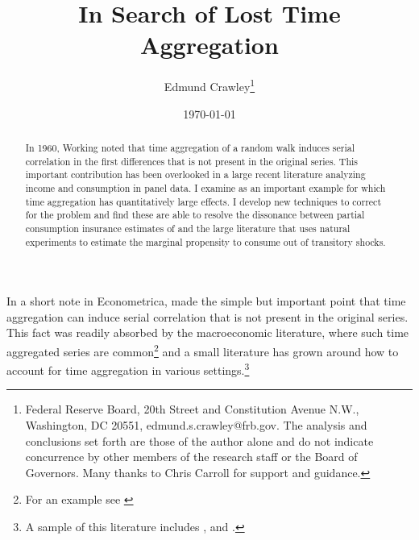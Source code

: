 \documentclass[AER]{AEA}
\begin{document}
\title{In Search of Lost Time Aggregation}
\author{Edmund Crawley\thanks{ Federal Reserve Board, 20th Street and Constitution Avenue N.W., Washington, DC 20551, edmund.s.crawley@frb.gov. The analysis and conclusions set forth are those of the author alone and do not indicate concurrence by other members of the research staff or the Board of Governors. Many thanks to Chris Carroll for support and guidance.}}
\date{\today}
\pubVolume{}
\pubIssue{}

\begin{abstract}
In 1960, Working noted that time aggregation of a random walk induces serial correlation in the first differences that is not present in the original series. This important contribution has been overlooked in a large recent literature analyzing income and consumption in panel data. I examine \cite{blundell_consumption_2008} as an important example for which time aggregation has quantitatively large effects. I develop new techniques to correct for the problem and find these are able to resolve the  dissonance between partial consumption insurance estimates of \cite{blundell_consumption_2008} and the large literature that uses natural experiments to estimate the marginal propensity to consume out of transitory shocks.
\end{abstract}


\maketitle

\newpage
In a short note in Econometrica, \cite{working_note_1960} made the simple but important point that time aggregation can induce serial correlation that is not present in the original series. This fact was readily absorbed by the macroeconomic literature, where such time aggregated series are common\footnote{For an example see \cite{campbell_consumption_1989}} and a small literature has grown around how to account for time aggregation in various settings.\footnote{A sample of this literature includes \cite{amemiya_effect_1972}, \cite{weiss_systematic_1984} and \cite{drost_temporal_1993}.}
\end{document}
